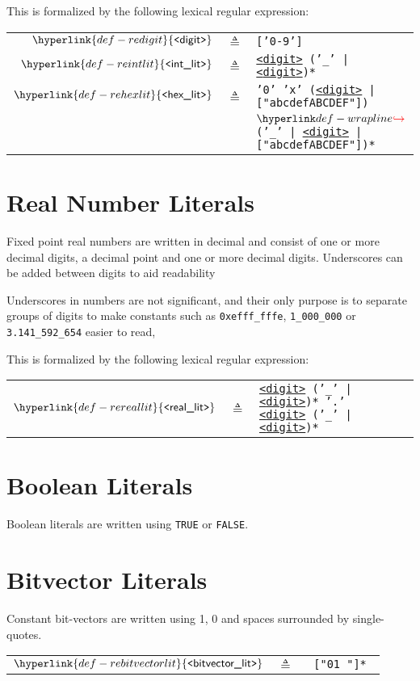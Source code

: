\documentclass{book}
\newcommand\Char[1]{\fbox{#1}}
\newcommand\Underscore[0]{'\_'}
\newcommand\REdigit[0]{\hyperlink{def-redigit}{\texttt{<}\textsf{digit}\texttt{>}}}
\newcommand\REintlit[0]{\hyperlink{def-reintlit}{\texttt{<}\textsf{int\_lit}\texttt{>}}}
\newcommand\REhexlit[0]{\hyperlink{def-rehexlit}{\texttt{<}\textsf{hex\_lit}\texttt{>}}}
\newcommand\REreallit[0]{\hyperlink{def-rereallit}{\texttt{<}\textsf{real\_lit}\texttt{>}}}
\newcommand\REbitvectorlit[0]{\hyperlink{def-rebitvectorlit}{\texttt{<}\textsf{bitvector\_lit}\texttt{>}}}
\begin{document}
This is formalized by the following lexical regular expression:
\hypertarget{def-redigit}{}
\hypertarget{def-reintlit}{}
\hypertarget{def-rehexlit}{}
\begin{center}
\begin{tabular}{rcl}
$\REdigit$  &$\triangleq$& \texttt{['0-9']}\\
$\REintlit$ &$\triangleq$& \texttt{\REdigit\ ('\_' | \REdigit)*}\\
$\REhexlit$ &$\triangleq$& \texttt{'0' 'x' (\REdigit\ | ["abcdefABCDEF"])} \\
          &            & $\wrappedline$ \texttt{('\_' | \REdigit\ | ["abcdefABCDEF"])*}
\end{tabular}
\end{center}

\section{Real Number Literals}
Fixed point real numbers are written in decimal and consist of one or more decimal digits, a decimal point and one
or more decimal digits. Underscores can be added between digits to aid readability

Underscores in numbers are not significant, and their only purpose is to separate groups of digits to make constants
such as \texttt{0xefff\_fffe}, \texttt{1\_000\_000} or \texttt{3.141\_592\_654} easier to read,

This is formalized by the following lexical regular expression:
\hypertarget{def-reallit}{}
\begin{center}
\begin{tabular}{rcl}
$\REreallit$ &$\triangleq$& \texttt{\REdigit\ (\Underscore\ | \REdigit)* '.' \REdigit\ (\Underscore\ | \REdigit)*}
\end{tabular}
\end{center}

\section{Boolean Literals}
Boolean literals are written using \texttt{TRUE} or \texttt{FALSE}.

\section{Bitvector Literals}
Constant bit-vectors are written using 1, 0 and spaces surrounded by single-quotes.
\hypertarget{def-rebitvectorlit}{}
\begin{center}
\begin{tabular}{rcl}
$\REbitvectorlit$ &$\triangleq$& \texttt{\Char{'} ["01 "]* \Char{'}}
\end{tabular}
\end{center}
\end{document}
